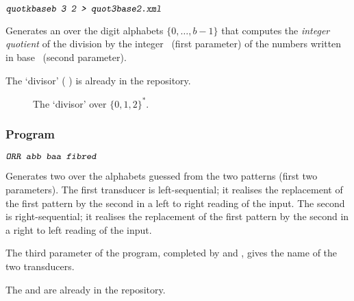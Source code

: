 \begin{SwClCmd}
\begin{shell}
$ \textsl{\texttt{quotkbaseb 3 2 > quot3base2.xml}}
$
\end{shell}%
\end{SwClCmd}%
\begin{SwClTxt}
    Generates an \fmpt over the digit alphabets $\{0,\ldots,b-1\}$
    that computes the \emph{integer quotient} of the division by the
    integer~ (first parameter) of the numbers written in
    base~ (second parameter).
\end{SwClTxt}%

\Comt
The `divisor'  (\cf
    ) is already in the
repository.

\begin{figure}[ht]
    \centering
    \caption{The `divisor'  over
    $\{0,1,2\}^{*}$. }
\label{fig:quo-app}
\end{figure}

\subsubsection{Program }


\begin{SwClCmd}
\begin{shell}
$ \textsl{\texttt{ORR abb baa fibred}}
$
\end{shell}%
\end{SwClCmd}%
\begin{SwClTxt}
    Generates two \fmpts over the alphabets guessed from the two patterns (first two parameters).
    The first transducer is left-sequential; it realises the replacement of the
    first pattern by the second in a left to right reading of the input. The
    second is right-sequential; it realises the replacement of the first pattern by the second
    in a right to left reading of the input.

    The third parameter of the program, completed by  and , gives the
    name of the two transducers.

\end{SwClTxt}%

\Comt
The \fmpts {} and  are already in the repository.



\SetTwClPrm{\TwClOne}%

\endinput
